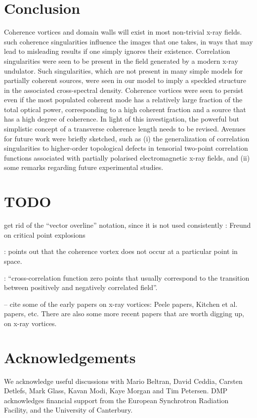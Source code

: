 \documentclass[%
 reprint,
 amsmath,amssymb,
 aps,
]{revtex4-1}
\begin{document}
\section{Conclusion}

Coherence vortices and domain walls will exist in most non-trivial x-ray fields.  such coherence singularities influence the images that one takes, in ways that may lead to misleading results if one simply ignores their existence.  Correlation singularities were seen to be present in the field generated by a modern x-ray undulator. Such singularities, which are not present in many simple models for partially coherent sources, were seen in our model to imply a speckled structure in the associated cross-spectral density.  Coherence vortices were seen to persist even if the most populated coherent mode has a relatively large fraction of the total optical power, corresponding to a high coherent fraction and a source that has a high degree of coherence. In light of this investigation, the powerful but simplistic concept of a transverse coherence length needs to be revised.   Avenues for future work were briefly sketched, such as (i) the generalization of correlation singularities to higher-order topological defects in tensorial two-point correlation functions associated with partially polarised electromagnetic x-ray fields, and (ii) some remarks regarding future experimental studies.  

\section*{TODO}

get rid of the ``vector overline'' notation, since it is not used consistently 
 \cite{Freund1999} : Freund on critical point explosions

\cite{GburVisser2003} : points out that the coherence vortex does not occur at a particular point in space.    

\cite{Rodrigo2015}: ``cross-correlation function zero points that usually correspond to the transition between positively and negatively correlated field''.  

-- cite some of the early papers on x-ray vortices: Peele papers, Kitchen et al. papers, etc. There are also some more recent papers that are worth digging up, on x-ray vortices.

\section*{Acknowledgements}

We acknowledge useful discussions with Mario Beltran, David Ceddia, Carsten Detlefs, Mark Glass, Kavan Modi, Kaye Morgan and Tim Petersen. DMP acknowledges financial support from the European Synchrotron Radiation Facility, and the University of Canterbury.  


\end{document}
